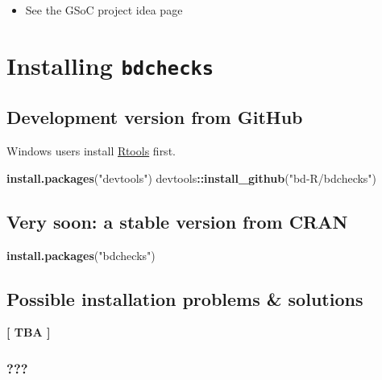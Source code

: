 \documentclass[]{book}
\newenvironment{Shaded}{\begin{snugshade}}{\end{snugshade}}
\newcommand{\KeywordTok}[1]{\textcolor[rgb]{0.13,0.29,0.53}{\textbf{#1}}}
\newcommand{\StringTok}[1]{\textcolor[rgb]{0.31,0.60,0.02}{#1}}
\newcommand{\OperatorTok}[1]{\textcolor[rgb]{0.81,0.36,0.00}{\textbf{#1}}}
\newcommand{\NormalTok}[1]{#1}
\providecommand{\tightlist}{%
  \setlength{\itemsep}{0pt}\setlength{\parskip}{0pt}}
\theoremstyle{definition}
\theoremstyle{definition}
\theoremstyle{definition}
\theoremstyle{remark}
\begin{document}
\begin{itemize}
\tightlist
\item
  See the GSoC project idea page
\end{itemize}

\chapter{\texorpdfstring{Installing
\texttt{bdchecks}}{Installing bdchecks}}\label{installing-bdchecks}

\section{Development version from
GitHub}\label{development-version-from-github}

Windows users install
\href{https://cran.r-project.org/bin/windows/Rtools/}{Rtools} first.

\begin{Shaded}
\begin{Highlighting}[]
\KeywordTok{install.packages}\NormalTok{(}\StringTok{"devtools"}\NormalTok{)}
\NormalTok{devtools}\OperatorTok{::}\KeywordTok{install_github}\NormalTok{(}\StringTok{"bd-R/bdchecks"}\NormalTok{)}
\end{Highlighting}
\end{Shaded}

\section{\texorpdfstring{{Very soon: a stable version from
CRAN}}{Very soon: a stable version from CRAN}}\label{very-soon-a-stable-version-from-cran}

\begin{Shaded}
\begin{Highlighting}[]
\KeywordTok{install.packages}\NormalTok{(}\StringTok{"bdchecks"}\NormalTok{)}
\end{Highlighting}
\end{Shaded}

\section{Possible installation problems \&
solutions}\label{possible-installation-problems-solutions}

\textbf{{{[} TBA {]}}}

\subsection{???}\label{section}
\end{document}
